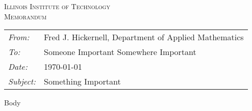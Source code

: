 \documentclass[11pt]{article}
\begin{document}
\begin{center}
\textsc{ Illinois Institute of Technology \\ Memorandum}
\bigskip

\begin{tabular}{l>{\raggedright}p{14cm}} \toprule
{\em From:} & Fred J. Hickernell, Department of Applied Mathematics \tabularnewline
{\em To:} & Someone Important Somewhere Important \tabularnewline
{\em Date:} &\today \tabularnewline
{\em Subject:} & Something Important \tabularnewline \bottomrule
\end{tabular}
\end{center}

Body
\end{document}
